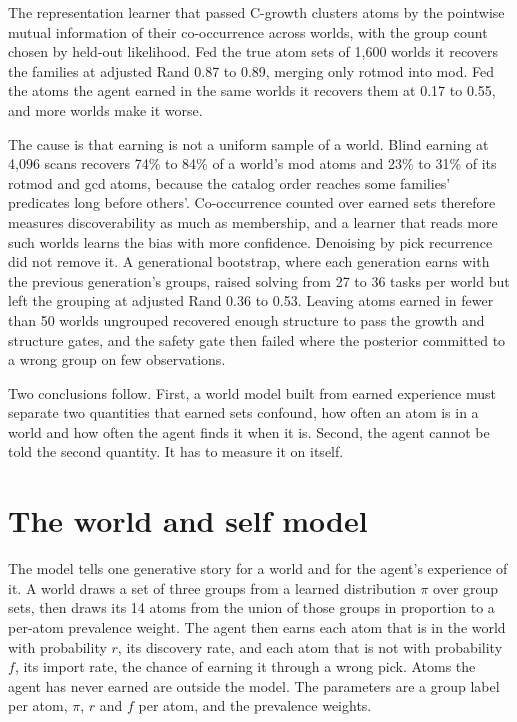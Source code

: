 \documentclass[11pt]{article}
\begin{document}
The representation learner that passed C-growth clusters atoms by the pointwise mutual information of their co-occurrence across worlds, with the group count chosen by held-out likelihood. Fed the true atom sets of 1,600 worlds it recovers the families at adjusted Rand 0.87 to 0.89, merging only rotmod into mod. Fed the atoms the agent earned in the same worlds it recovers them at 0.17 to 0.55, and more worlds make it worse.

The cause is that earning is not a uniform sample of a world. Blind earning at 4,096 scans recovers 74\% to 84\% of a world's mod atoms and 23\% to 31\% of its rotmod and gcd atoms, because the catalog order reaches some families' predicates long before others'. Co-occurrence counted over earned sets therefore measures discoverability as much as membership, and a learner that reads more such worlds learns the bias with more confidence. Denoising by pick recurrence did not remove it. A generational bootstrap, where each generation earns with the previous generation's groups, raised solving from 27 to 36 tasks per world but left the grouping at adjusted Rand 0.36 to 0.53. Leaving atoms earned in fewer than 50 worlds ungrouped recovered enough structure to pass the growth and structure gates, and the safety gate then failed where the posterior committed to a wrong group on few observations.

Two conclusions follow. First, a world model built from earned experience must separate two quantities that earned sets confound, how often an atom is in a world and how often the agent finds it when it is. Second, the agent cannot be told the second quantity. It has to measure it on itself.

\section{The world and self model}

The model tells one generative story for a world and for the agent's experience of it. A world draws a set of three groups from a learned distribution $\pi$ over group sets, then draws its 14 atoms from the union of those groups in proportion to a per-atom prevalence weight. The agent then earns each atom that is in the world with probability $r$, its discovery rate, and each atom that is not with probability $f$, its import rate, the chance of earning it through a wrong pick. Atoms the agent has never earned are outside the model. The parameters are a group label per atom, $\pi$, $r$ and $f$ per atom, and the prevalence weights.
\end{document}
